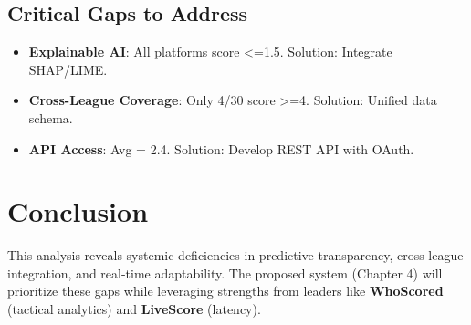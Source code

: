 \subsection{Critical Gaps to Address}
\begin{itemize}
    \item \textbf{Explainable AI}: All platforms score <=1.5. Solution: Integrate SHAP/LIME.
    \item \textbf{Cross-League Coverage}: Only 4/30 score >=4. Solution: Unified data schema.
    \item \textbf{API Access}: Avg = 2.4. Solution: Develop REST API with OAuth.
\end{itemize}


\section{Conclusion}
This analysis reveals systemic deficiencies in predictive transparency, cross-league integration, and real-time adaptability. The proposed system (Chapter 4) will prioritize these gaps while leveraging strengths from leaders like \textbf{WhoScored} (tactical analytics) and \textbf{LiveScore} (latency).